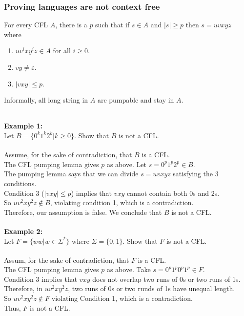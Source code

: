 \documentclass[11pt]{article}
\begin{document}
\subsubsection{Proving languages are not context free}
\begin{note_special}
For every CFL $A$, there is a $p$ such that if $s\in A$ and $|s|\ge p$ then $s=uvxyz$ where
\begin{enumerate}
    \item $uv^ixy^iz\in A$ for all $i\ge 0$.
    \item $vy\neq\varepsilon$.
    \item $|vxy|\le p$.
\end{enumerate}
Informally, all long string in $A$ are pumpable and stay in $A$.
\end{note_special}
$\quad$\\[-1em]
\textbf{Example 1:}\\
Let $B=\{0^k1^k2^k|k\ge 0\}$. Show that $B$ is not a CFL.
\\\\
Assume, for the sake of contradiction, that $B$ is a CFL.\\
The CFL pumping lemma gives $p$ as above. Let $s=0^p1^p2^p\in B$.\\
The pumping lemma says that we can divide $s=uvxyz$ satisfying the 3 conditions.\\
Condition 3 ($|vxy|\le p$) implies that $vxy$ cannot contain both 0s and 2s.\\
So $uv^2xy^2z\not\in B$, violating condition 1, which is a contradiction.\\
Therefore, our assumption is false. We conclude that $B$ is not a CFL.
\\\\
\textbf{Example 2:}\\
Let $F=\{ww|w\in\Sigma^{\ast}\}$ where $\Sigma=\{0,1\}$. Show that $F$ is not a CFL.
\\\\
Assum, for the sake of contradiction, that $F$ is a CFL.\\
The CFL pumping lemma gives $p$ as above. Take $s=0^p1^p0^p1^p\in F$.\\
Condition 3 implies that $vxy$ does not overlap two runs of 0s or two runs of 1s.\\
Therefore, in $uv^2xy^2z$, two runs of 0s or two runds of 1s have unequal length.\\
So $uv^2xy^2z\not\in F$ violating Condition 1, which is a contradiction.\\
Thus, $F$ is not a CFL.
\end{document}
